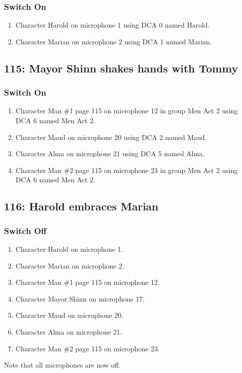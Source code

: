 \subsubsection* {Switch On}
\begin{enumerate}
\item Character Harold on microphone 1 using DCA 0 named Harold.
\item Character Marian on microphone 2 using DCA 1 named Marian.
\end{enumerate}
\subsection* {115: Mayor Shinn shakes hands with Tommy}
\subsubsection* {Switch On}
\begin{enumerate}
\item Character Man \#1 page 115 on microphone 12 in group Men Act 2 using DCA 6 named Men Act 2.
\item Character Maud on microphone 20 using DCA 2 named Maud.
\item Character Alma on microphone 21 using DCA 5 named Alma.
\item Character Man \#2 page 115 on microphone 23 in group Men Act 2 using DCA 6 named Men Act 2.
\end{enumerate}
\subsection* {116: Harold embraces Marian}
\subsubsection* {Switch Off}
\begin{enumerate}
\item Character Harold on microphone 1.
\item Character Marian on microphone 2.
\item Character Man \#1 page 115 on microphone 12.
\item Character Mayor Shinn on microphone 17.
\item Character Maud on microphone 20.
\item Character Alma on microphone 21.
\item Character Man \#2 page 115 on microphone 23.
\end{enumerate}
Note that all microphones are now off.
